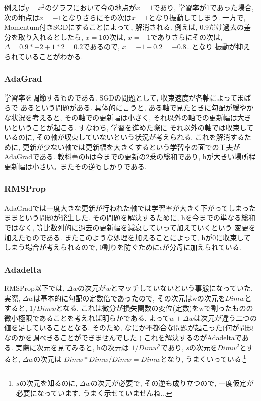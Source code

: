 \documentclass[a4paper,11pt]{jsarticle}
\begin{document}
例えば$ y = x^2 $のグラフにおいて今の地点が$x = 1$であり, 学習率が1であった場合,
次の地点は$x = -1$となりさらにその次は$x = 1$となり振動してしまう.
一方で, Momentum付きSGDにすることによって, 解消される. 例えば, 0.9だけ過去の差分を取り入れるとしたら,
$x = 1$の次は, $x = - 1$でありさらにその次は, $\Delta = 0.9 * -2 + 1 * 2 = 0.2$であるので, $x = -1 + 0.2 = -0.8$...となり
振動が抑えられていることがわかる.
\subsubsection*{AdaGrad}
学習率を調節するものである. SGDの問題として, 収束速度が各軸によってまばらで
あるという問題がある. 具体的に言うと, ある軸で見たときに勾配が緩やかな状況を考えると,
その軸での更新幅は小さく, それ以外の軸での更新幅は大きいということが起こる. すなわち, 学習を進めた際に
それ以外の軸では収束しているのに, その軸が収束していないという状況が考えられる.
これを解消するために, 更新が少ない軸では更新幅を大きくするという学習率の面での工夫がAdaGradである.
教科書のhは今までの更新の2乗の総和であり, hが大きい場所程更新幅は小さい。またその逆もしかりである.
\subsubsection*{RMSProp}
AdaGradでは一度大きな更新が行われた軸では学習率が大きく下がってしまったままという問題が発生した.
その問題を解決するために, hを今までの単なる総和ではなく, 等比数列的に過去の更新幅を減衰していって加えていくという
変更を加えたものである. またこのような処理を加えることによって, hが0に収束してしまう場合が考えられるので,
0割りを防ぐために$\epsilon$が分母に加えられている.
\subsubsection*{Adadelta}
RMSProp以下では, $\Delta w$の次元が$w$とマッチしていないという事態になっていた.
実際, $\Delta w$は基本的に勾配の定数倍であったので, その次元はwの次元を$Dimw$とすると,
$1/Dimw$となる.
これは微分が損失関数の変位(定数)をwで割ったものの微小極限であることを考えれば明らかである.
よって$w + \Delta w$は次元が違う二つの値を足していることとなる.
そのため, なにか不都合な問題が起こった(何が問題なのかを調べきることができませんでした.)
これを解決するのがAdadeltaである. 実際に次元を見てみると,
hの次元は $1 / Dimw^2$であり, $s$の次元を$Dimw^2$とすると, $\Delta w$の次元は
$Dimw * Dimw / Dimw = Dimw$となり, うまくいっている.\footnote{$s$の次元を知るのに, $\Delta w$の次元が必要で,
  その逆も成り立つので, 一度仮定が必要になっています. うまく示せていませんね...}
\end{document}
